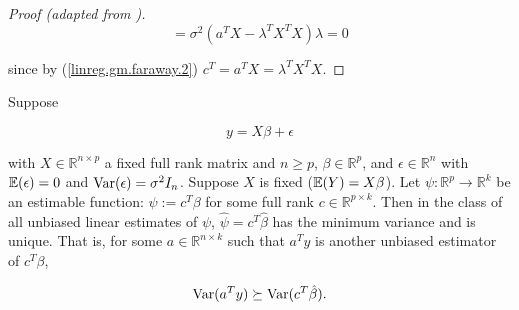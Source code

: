\begin{proof}[Proof (adapted from \citet{faraway2002})]
\[
= \sigma^2 \left(a^T X -  \lambda^TX^T X  \right) \lambda = 0
\]

since by (\ref{linreg.gm.faraway.2}) \(c^T = a^TX =  \lambda^TX^T X\).

%
%
%

%
%
%

%
%

\end{proof}

\begin{theorem}\label{linreg.gauss.markov.gen}

Suppose

\[
y = X \beta + \epsilon
\]

with \(X \in \mathbb{R}^{n \times p}\) a fixed full rank matrix and \(n \geq p\), \(\beta \in \mathbb{R}^p\), and \(\epsilon \in \mathbb{R}^n\) with \(\E (\epsilon )= 0\) and \(\Var( \epsilon) = \sigma^2 I_n\). Suppose \(X\) is fixed (\(\E (Y) = X \beta\)). Let \(\psi : \mathbb{R}^p \to \mathbb{R}^k\) be an estimable function: \(\psi :=  c^T \beta \) for some full rank \(c \in \mathbb{R}^{p \times k}\). Then in the class of all unbiased linear estimates of \(\psi\), \(\hat{\psi} = c^T \hat{\beta}\) has the minimum variance and is unique. That is, for some \(a \in \mathbb{R}^{n \times k}\) such that \(a^Ty\) is another unbiased estimator of \( c^T\beta\),

\[
\Var(a ^Ty ) \succeq \Var(c^T \hat{\beta}).
\]

\end{theorem}

